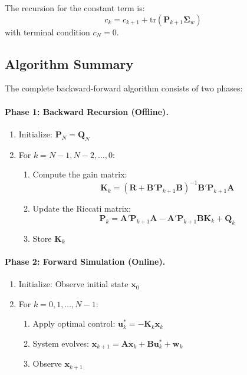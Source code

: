 \documentclass[12pt, a4paper]{article}
\begin{document}
The recursion for the constant term is:
\begin{equation}
    c_k = c_{k+1} + \text{tr}(\bm{P}_{k+1} \bm{\Sigma}_w)
    \label{eq:app_ck_recursion}
\end{equation}
with terminal condition $c_N = 0$.

\subsection{Algorithm Summary}

The complete backward-forward algorithm consists of two phases:

\paragraph{Phase 1: Backward Recursion (Offline).}
\begin{enumerate}
    \item Initialize: $\bm{P}_N = \bm{Q}_N$
    \item For $k = N-1, N-2, \ldots, 0$:
    \begin{enumerate}
        \item Compute the gain matrix:
        \begin{equation*}
            \bm{K}_k = (\bm{R} + \bm{B}' \bm{P}_{k+1} \bm{B})^{-1} 
            \bm{B}' \bm{P}_{k+1} \bm{A}
        \end{equation*}
        \item Update the Riccati matrix:
        \begin{equation*}
            \bm{P}_k = \bm{A}' \bm{P}_{k+1} \bm{A} - 
            \bm{A}' \bm{P}_{k+1} \bm{B} \bm{K}_k + \bm{Q}_k
        \end{equation*}
        \item Store $\bm{K}_k$
    \end{enumerate}
\end{enumerate}

\paragraph{Phase 2: Forward Simulation (Online).}
\begin{enumerate}
    \item Initialize: Observe initial state $\bm{x}_0$
    \item For $k = 0, 1, \ldots, N-1$:
    \begin{enumerate}
        \item Apply optimal control: $\bm{u}_k^* = -\bm{K}_k \bm{x}_k$
        \item System evolves: $\bm{x}_{k+1} = \bm{A}\bm{x}_k + 
        \bm{B}\bm{u}_k^* + \bm{w}_k$
        \item Observe $\bm{x}_{k+1}$
    \end{enumerate}
\end{enumerate}
\end{document}
